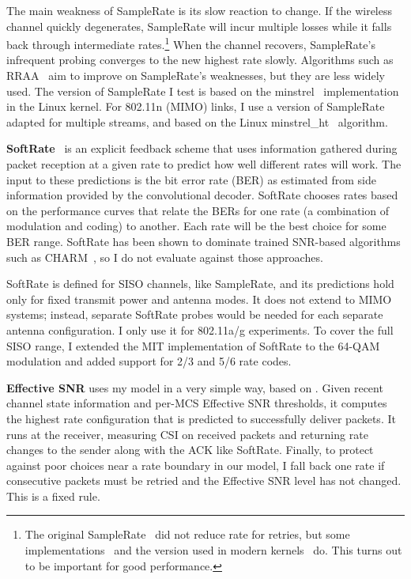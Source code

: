 The main weakness of SampleRate is its slow reaction to change. If the wireless channel quickly degenerates, SampleRate will incur multiple losses while it falls back through intermediate rates.\footnote{The original SampleRate~\cite{Bicket_SampleRate} did not reduce rate for retries, but some implementations~\cite{Judd_CHARM} and the version used in modern kernels~\cite{minstrel} do. This turns out to be important for good performance.} When the channel recovers, SampleRate's infrequent probing converges to the new highest rate slowly. Algorithms such as 
RRAA~\cite{Wong_RRAA} aim to improve on SampleRate's weaknesses, but they are less widely used. The version of SampleRate I test is based on the minstrel~\cite{minstrel} implementation in the Linux kernel. For 802.11n (MIMO) links, I use a version of SampleRate adapted for multiple streams, and based on the Linux minstrel\_ht~\cite{minstrel_ht} algorithm.

\textbf{SoftRate}~\cite{Vutukuru_SoftRate} is an explicit feedback scheme that uses information gathered during packet reception at a given rate to predict how well different rates will work. The input to these predictions is the bit error rate (BER) as estimated from side information provided by the convolutional decoder. SoftRate chooses rates based on the performance curves that relate the BERs for one rate (a combination of modulation and coding) to another. %
Each rate will be the best choice for some BER range. SoftRate has been shown to dominate trained SNR-based algorithms such as CHARM~\cite{Judd_CHARM}, so I do not evaluate against those approaches.


SoftRate is defined for SISO channels, like SampleRate, 
and its predictions hold only for fixed transmit power and antenna modes. It does not extend to MIMO systems; instead, separate SoftRate probes would be needed for each separate antenna configuration.
I only use it for 802.11a/g experiments. To cover the full SISO range, I extended the MIT implementation of SoftRate to the 64-QAM modulation and added support for 2/3 and 5/6 rate codes.

\textbf{Effective SNR} uses my model in a very simple way, based on . Given recent channel state information and per-MCS Effective SNR thresholds, it computes the highest rate configuration that is predicted to successfully deliver packets. It runs at the receiver, measuring CSI on received packets and returning rate changes to the sender along with the ACK like SoftRate. Finally, to protect against poor choices near a rate boundary in our model, I fall back one rate if consecutive packets must be retried and the Effective SNR level has not changed. This is a fixed rule.


